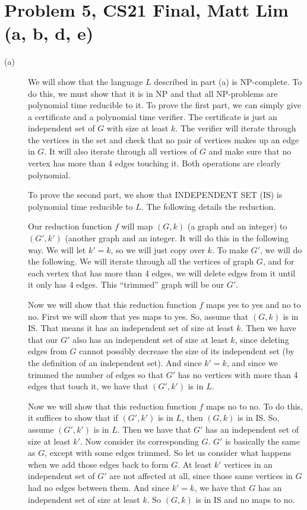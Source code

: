 \documentclass{article}
\begin{document}
\section*{Problem 5, CS21 Final, Matt Lim (a, b, d, e)}
\begin{description}
    \item[(a)]
        We will show that the language $L$ described in part (a) is NP-complete.
        To do this, we must show that it is in NP and that all NP-problems are
        polynomial time reducible to it. To prove the first part, we can simply
        give a certificate and a polynomial time verifier. The certificate is
        just an independent set of $G$ with size at least $k$. The verifier will
        iterate through the vertices in the set and check that no pair of vertices
        makes up an edge in $G$. It will also iterate through all vertices
        of $G$ and make sure that no vertex has more than 4 edges touching it.
        Both operations are clearly polynomial.

        To prove the second part, we show that INDEPENDENT SET (IS) is polynomial time
        reducible to $L$. The following details the reduction.

        Our reduction function $f$ will map $(G,k)$ (a graph and an integer) to
        $(G',k')$ (another graph and an integer. It will do this in the
        following way. We will let $k' = k$, so we will just copy over $k$.
        To make $G'$, we will do the following. We will iterate through all the
        vertices of graph $G$, and for each vertex that has more than 4 edges,
        we will delete edges from it until it only has 4 edges. This ``trimmed''
        graph will be our $G'$.

        Now we will show that this reduction function $f$ maps yes to yes and
        no to no. First we will show that yes maps to yes. So, assume that
        $(G,k)$ is in IS. That means it has an independent set of size at least
        $k$. Then we have that our $G'$ also has an independent set of size at
        least $k$, since deleting edges from $G$ cannot possibly decrease the
        size of its independent set (by the definition of an independent set).
        And since $k' = k$, and since we trimmed the number of edges so that
        $G'$ has no vertices with more than 4 edges that touch it, we have that
        $(G',k')$ is in $L$.

        Now we will show that this reduction function $f$ maps no to no. To do
        this, it suffices to show that if $(G',k')$ is in $L$, then $(G,k)$ is
        in IS. So, assume $(G',k')$ is in $L$. Then we have that $G'$ has
        an independent set of size at least $k'$. Now consider its corresponding $G$.
        $G'$ is basically the same as $G$, except with some edges trimmed. So
        let us consider what happens when we add those edges back to form $G$.
        At least $k'$ vertices in an independent set of $G'$ are not affected at all,
        since those same vertices in $G$ had no edges between them. And since
        $k' = k$, we have that $G$ has an independent set of size at least $k$.
        So $(G,k)$ is in IS and no maps to no.


\end{description}
\end{document}
